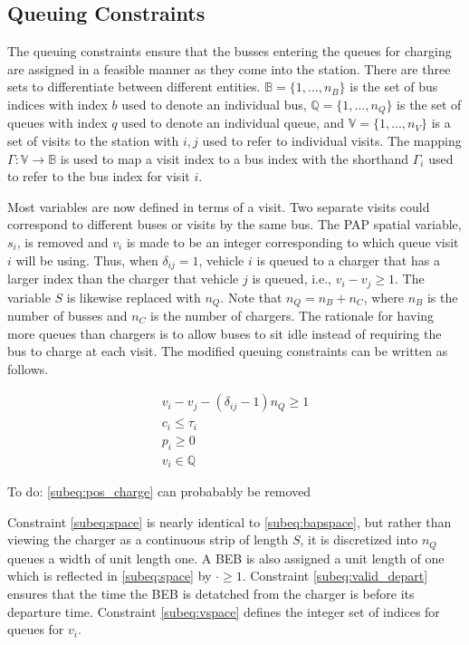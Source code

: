 \documentclass[utf8]{FrontiersinHarvard}
\newcommand{\TODO}[1]{{\color{green} To do: #1}}                                %
\begin{document}
\subsection{Queuing Constraints} \label{sec:queuing}
\noindent
The queuing constraints ensure that the busses entering the queues for charging are assigned in a feasible manner as they come into the
station. There are three sets to differentiate between different entities. $\mathbb{B} = \{1, ..., n_B\}$ is the set of
bus indices with index $b$ used to denote an individual bus, $\mathbb{Q} = \{1, ..., n_Q\}$ is the set of queues with index $q$
used to denote an individual queue, and $\mathbb{V} = \{1, ..., n_V\}$ is a set of visits to the station with $i,j$ used
to refer to individual visits. The mapping $\Gamma: \mathbb{V} \rightarrow \mathbb{B}$ is used to map a visit index to a bus index with
the shorthand $\Gamma_i$ used to refer to the bus index for visit $i$.

Most variables are now defined in terms of a visit. Two separate visits could correspond to different buses or visits by
the same bus. The PAP spatial variable, $s_i$, is removed and $v_i$ is made to be an integer corresponding to which queue
visit $i$ will be using. Thus, when $\delta_{ij} = 1$, vehicle $i$ is queued to a charger that has a larger index than the
charger that vehicle $j$ is queued, i.e., $v_i-v_j \geq 1$. The
variable $S$ is likewise replaced with $n_Q$. Note that $n_Q = n_B + n_C$, where $n_B$ is the number of busses and $n_C$
is the number of chargers. The rationale for having more queues than chargers is to allow buses to sit idle instead of 
requiring the bus to charge at each visit. The modified queuing constraints can be written as follows.

\begin{subequations}
\label{eq:packconstrs}
\begin{align}
    v_i - v_j - (\delta_{ij} - 1)n_Q \geq 1       \label{subeq:space}        \\
    c_i \leq \tau_i                             \label{subeq:valid_depart} \\
    p_i \geq 0                               \label{subeq:pos_charge} \\
    v_i \in \mathbb{Q}                       \label{subeq:vspace}
\end{align}
\end{subequations}

\TODO{\eqref{subeq:pos_charge} can probabably be removed}

Constraint \eqref{subeq:space} is nearly identical to \eqref{subeq:bapspace}, but rather than viewing the charger as
a continuous strip of length $S$, it is discretized into $n_Q$ queues a width of unit length one. A BEB is also assigned a unit
length of one which is reflected in \eqref{subeq:space} by $\cdot \geq 1$. Constraint \eqref{subeq:valid_depart} ensures that the
time the BEB is detatched from the charger is before its departure time. Constraint \eqref{subeq:vspace} defines the integer set of
indices for queues for $v_i$.
\end{document}
